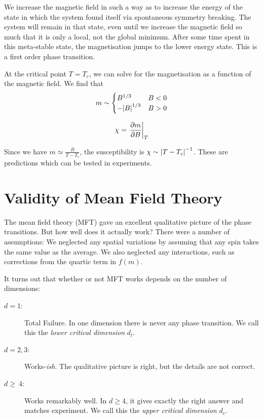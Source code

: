 We increase the magnetic field in such a way as to increase the energy of the state in which the system found itself via spontaneous symmetry breaking.
The system will remain in that state, even until we increase the magnetic field so much that it is only a local, not the global minimum.
After some time spent in this meta-stable state, the magnetisation jumps to the lower energy state.
This is a first order phase transition.

At the critical point $T = T_c$, we can solve for the magnetisation as a function of the magnetic field. We find that 
\begin{equation}
  m \sim 
  \begin{cases}
    B^{1/3} & B < 0 \\
    -\abs{B}^{1/3} & B > 0
  \end{cases}
\end{equation}

\begin{definition}
  \begin{equation}
    \chi = \left.\pdv{m}{B}\right\rvert_T
  \end{equation}
\end{definition}

Since we have $m \simeq \frac{B}{T - T_c}$, the susceptibility is $\chi \sim \abs{T - T_c}^{-1}$.
These are predictions which can be tested in experiments.

\section{Validity of Mean Field Theory}%
\label{sec:validity_of_mean_field_theory}

The mean field theory (MFT) gave an excellent qualitative picture of the phase transitions. But how well does it actually work?
There were a number of assumptions: We neglected any spatial variations by assuming that any spin takes the same value as the average. We also neglected any interactions, such as corrections from the quartic term in $f(m)$.

It turns out that whether or not MFT works depends on the number of dimensions:
\begin{description}
  \item[$d = 1$:] Total Failure. In one dimension there is never any phase transition. We call this the \emph{lower critical dimension} $d_l$.
  \item[$d = 2,3$:] Works-\emph{ish}. The qualitative picture is right, but the details are not correct.
  \item[$d \geqslant~4$:] Works remarkably well. In $d \geq 4$, it gives exactly the right answer and matches experiment.
    We call this the \emph{upper critical dimension} $d_c$.
\end{description}

